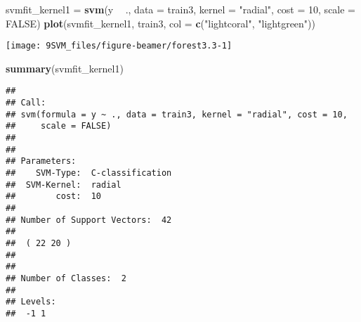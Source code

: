\documentclass[10pt,ignorenonframetext,]{beamer}
\newenvironment{Shaded}{\begin{snugshade}}{\end{snugshade}}
\newcommand{\DataTypeTok}[1]{\textcolor[rgb]{0.13,0.29,0.53}{#1}}
\newcommand{\DecValTok}[1]{\textcolor[rgb]{0.00,0.00,0.81}{#1}}
\newcommand{\KeywordTok}[1]{\textcolor[rgb]{0.13,0.29,0.53}{\textbf{#1}}}
\newcommand{\NormalTok}[1]{#1}
\newcommand{\OperatorTok}[1]{\textcolor[rgb]{0.81,0.36,0.00}{\textbf{#1}}}
\newcommand{\OtherTok}[1]{\textcolor[rgb]{0.56,0.35,0.01}{#1}}
\newcommand{\StringTok}[1]{\textcolor[rgb]{0.31,0.60,0.02}{#1}}
\begin{document}
\begin{frame}[fragile]

\scriptsize

\begin{Shaded}
\begin{Highlighting}[]
\NormalTok{svmfit_kernel1 =}\StringTok{ }\KeywordTok{svm}\NormalTok{(y }\OperatorTok{~}\StringTok{ }\NormalTok{., }\DataTypeTok{data =}\NormalTok{ train3, }\DataTypeTok{kernel =} \StringTok{"radial"}\NormalTok{, }\DataTypeTok{cost =} \DecValTok{10}\NormalTok{, }
    \DataTypeTok{scale =} \OtherTok{FALSE}\NormalTok{)}
\KeywordTok{plot}\NormalTok{(svmfit_kernel1, train3, }\DataTypeTok{col =} \KeywordTok{c}\NormalTok{(}\StringTok{"lightcoral"}\NormalTok{, }\StringTok{"lightgreen"}\NormalTok{))}
\end{Highlighting}
\end{Shaded}

\begin{center}\texttt{[image: 9SVM\_files/figure-beamer/forest3.3-1]} \end{center}

\end{frame}

\begin{frame}[fragile]

\scriptsize

\begin{Shaded}
\begin{Highlighting}[]
\KeywordTok{summary}\NormalTok{(svmfit_kernel1)}
\end{Highlighting}
\end{Shaded}

\begin{verbatim}
## 
## Call:
## svm(formula = y ~ ., data = train3, kernel = "radial", cost = 10, 
##     scale = FALSE)
## 
## 
## Parameters:
##    SVM-Type:  C-classification 
##  SVM-Kernel:  radial 
##        cost:  10 
## 
## Number of Support Vectors:  42
## 
##  ( 22 20 )
## 
## 
## Number of Classes:  2 
## 
## Levels: 
##  -1 1
\end{verbatim}

\normalsize

\end{frame}
\end{document}
